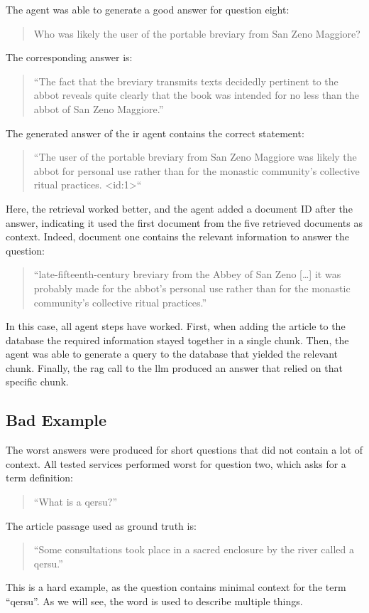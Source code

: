 \documentclass[../main.tex]{subfiles}
\begin{document}
The agent was able to generate a good answer for question eight:
\begin{quote}
      Who was likely the user of the portable breviary from San Zeno Maggiore?
\end{quote}
The corresponding answer is:
\begin{quote}
      ``The fact that the breviary transmits texts decidedly pertinent
      to the abbot reveals quite clearly that the book was intended
      for no less than \textcolor{emph blue}{the abbot of San Zeno Maggiore}.''
\end{quote}
The generated answer of the \gls{ir} agent contains the correct statement:
\begin{quote}
      ``The user of the portable breviary from San Zeno Maggiore was likely
      \textcolor{emph blue}{the abbot} for personal use rather than for the monastic
      community's collective ritual practices. <id:1>``
\end{quote}
Here, the retrieval worked better,
and the agent added a document ID after the answer,
indicating it used the first document from the five retrieved documents as context.
Indeed, document one contains the relevant information to answer the question:
\begin{quote}
      ``late-fifteenth-century breviary from the Abbey of San Zeno [\dots]
      it was probably made for the abbot's personal use rather than
      for the monastic community's collective ritual practices.''
\end{quote}
In this case, all agent steps have worked.
First, when adding the article to the database the required information stayed
together in a single chunk.
Then, the agent was able to generate a query to the database that yielded the
relevant chunk.
Finally, the \gls{rag} call to the \gls{llm} produced an answer that relied on that
specific chunk.

\subsection{Bad Example}

The worst answers were produced for short questions that did not contain a lot of context.
All tested services performed worst for question two,
which asks for a term definition:
\begin{quote}
      ``What is a qersu?''
\end{quote}
The article passage used as ground truth is:
\begin{quote}
      ``Some consultations took place in \textcolor{emph blue}{a sacred enclosure}
      by the river \textcolor{emph blue}{called a qersu}.''
\end{quote}
This is a hard example, as the question contains minimal context for the term ``qersu''.
As we will see, the word is used to describe multiple things.
\end{document}
